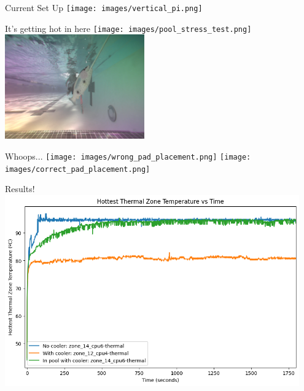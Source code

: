 \begin{frame}{Current Set Up}
    \centering
    \texttt{[image: images/vertical\_pi.png]}
\end{frame}

\begin{frame}{It's getting hot in here}
    \centering
    \texttt{[image: images/pool\_stress\_test.png]}
    \includegraphics[height=0.95\textheight,width=0.45\textwidth,keepaspectratio]{images/ginny_rubik_pi.png}
\end{frame}

\begin{frame}{Whoops...}
    \centering
    \texttt{[image: images/wrong\_pad\_placement.png]}
    \texttt{[image: images/correct\_pad\_placement.png]}
\end{frame}

\begin{frame}{Results!}
    \centering
    \includegraphics[height=0.95\textheight,width=0.95\textwidth,keepaspectratio]{images/hottest_zone_comparison.png}
\end{frame}

